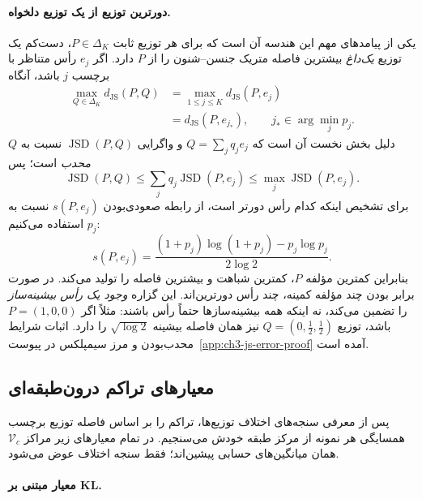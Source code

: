 \paragraph{دورترین توزیع از یک توزیع دلخواه.}
یکی از پیامدهای مهم این هندسه آن است
که برای هر توزیع ثابت $P\in\Delta_K$،
دست‌کم یک توزیع \emph{یک‌داغ}
بیشترین فاصله متریک جنسن--شنون را
از $P$ دارد. اگر $e_j$ رأس متناظر با
برچسب $j$ باشد، آنگاه
\begin{equation}\label{eq:ch3-js-farthest-vertex}
\boxed{
\begin{aligned}
\max_{Q\in\Delta_K}d_{\mathrm{JS}}(P,Q)
&=\max_{1\le j\le K}d_{\mathrm{JS}}(P,e_j)\\
&=d_{\mathrm{JS}}(P,e_{j_*}),
\qquad j_*\in\arg\min_j p_j.
\end{aligned}}
\end{equation}
دلیل بخش نخست آن است که
$Q=\sum_jq_je_j$ و واگرایی
$\operatorname{JSD}(P,Q)$ نسبت به $Q$
\emph{محدب} است؛ پس
\[
\operatorname{JSD}(P,Q)
\le\sum_jq_j\operatorname{JSD}(P,e_j)
\le\max_j\operatorname{JSD}(P,e_j).
\]
برای تشخیص اینکه کدام رأس دورتر است،
از رابطه صعودی‌بودن
$s(P,e_j)$ نسبت به $p_j$ استفاده می‌کنیم:
\[
s(P,e_j)=
\frac{(1+p_j)\log(1+p_j)-p_j\log p_j}
{2\log2}.
\]
بنابراین کمترین مؤلفه $P$،
کمترین شباهت و بیشترین فاصله را
تولید می‌کند. در صورت برابر بودن
چند مؤلفه کمینه، چند رأس دورترین‌اند.
این گزاره \emph{وجود یک رأس بیشینه‌ساز}
را تضمین می‌کند، نه اینکه همه
بیشینه‌سازها حتماً رأس باشند:
مثلاً اگر $P=(1,0,0)$ باشد،
توزیع $Q=(0,\tfrac12,\tfrac12)$
نیز همان فاصله بیشینه $\sqrt{\log2}$
را دارد. اثبات شرایط محدب‌بودن و
مرز سیمپلکس در
پیوست~\ref{app:ch3-js-error-proof} آمده است.


\subsection{معیارهای تراکم درون‌طبقه‌ای}
\label{subsec:ch3-within-class-compactness}
پس از معرفی سنجه‌های اختلاف توزیع‌ها،
تراکم را بر اساس فاصله توزیع برچسب همسایگی
هر نمونه از مرکز طبقه خودش می‌سنجیم.
در تمام معیارهای زیر مراکز $\mathcal V_c$
همان میانگین‌های حسابی پیشین‌اند؛
فقط سنجه اختلاف عوض می‌شود.

\paragraph{معیار مبتنی بر KL.}

